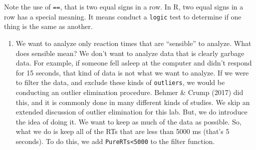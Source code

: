 \documentclass[]{book}
\providecommand{\tightlist}{%
  \setlength{\itemsep}{0pt}\setlength{\parskip}{0pt}}
\theoremstyle{definition}
\theoremstyle{definition}
\theoremstyle{definition}
\theoremstyle{remark}
\begin{document}
Note the use of \texttt{==}, that is two equal signs in a row. In R, two
equal signs in a row has a special meaning. It means conduct a
\texttt{logic} test to determine if one thing is the same as another.

\begin{enumerate}
\def\labelenumi{\arabic{enumi}.}
\setcounter{enumi}{2}
\tightlist
\item
  We want to analyze only reaction times that are ``sensible'' to
  analyze. What does sensible mean? We don't want to analyze data that
  is clearly garbage data. For example, if someone fell asleep at the
  computer and didn't respond for 15 seconds, that kind of data is not
  what we want to analyze. If we were to filter the data, and exclude
  these kinds of \texttt{outliers}, we would be conducting an outlier
  elimination procedure. Behmer \& Crump (2017) did this, and it is
  commonly done in many different kinds of studies. We skip an extended
  discussion of outlier elimination for this lab. But, we do introduce
  the idea of doing it. We want to keep as much of the data as possible.
  So, what we do is keep all of the RTs that are less than 5000 ms
  (that's 5 seconds). To do this, we add \texttt{PureRTs\textless{}5000}
  to the filter function.
\end{enumerate}
\end{document}
